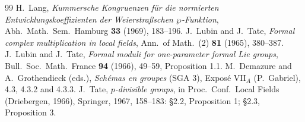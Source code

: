\documentclass[11pt]{amsart}
\theoremstyle{definition}
\theoremstyle{remark}
\begin{document}
\begin{thebibliography}{99}
 H.~Lang, \emph{Kummersche Kongruenzen f\"ur die normierten Entwicklungskoeffizienten der Weierstra\ss schen $\wp$-Funktion}, Abh.\ Math.\ Sem.\ Hamburg \textbf{33} (1969), 183--196.
 J.~Lubin and J.~Tate, \emph{Formal complex multiplication in local fields}, Ann.\ of Math.\ (2) \textbf{81} (1965), 380--387.
 J.~Lubin and J.~Tate, \emph{Formal moduli for one-parameter formal Lie groups}, Bull.\ Soc.\ Math.\ France \textbf{94} (1966), 49--59, Proposition 1.1.
 M.~Demazure and A.~Grothendieck (eds.), \emph{Sch\'emas en groupes} (SGA 3), Expos\'e VII$_A$ (P.~Gabriel), 4.3, 4.3.2 and 4.3.3.
 J.~Tate, \emph{$p$-divisible groups}, in Proc.\ Conf.\ Local Fields (Driebergen, 1966), Springer, 1967, 158--183: \S2.2, Proposition 1; \S2.3, Proposition 3.
\end{thebibliography}
\end{document}
